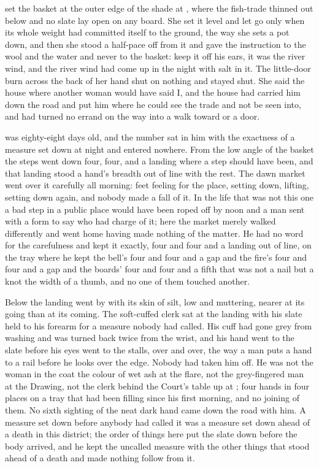 
 set the basket at the outer edge of the shade at , where the fish-trade thinned out below  and no slate lay open on any board. She set it level and let go only when its whole weight had committed itself to the ground, the way she sets a pot down, and then she stood a half-pace off from it and gave the instruction to the wool and the water and never to the basket: keep it off his ears, it was the river wind, and the river wind had come up in the night with salt in it. The little-door burn across the back of her hand shut on nothing and stayed shut. She said the house where another woman would have said I, and the house had carried him down the road and put him where he could see the trade and not be seen into, and had turned no errand on the way into a walk toward  or a door.

 was eighty-eight days old, and the number sat in him with the exactness of a measure set down at night and entered nowhere. From the low angle of the basket the steps went down four, four, and a landing where a step should have been, and that landing stood a hand's breadth out of line with the rest. The dawn market went over it carefully all morning: feet feeling for the place, setting down, lifting, setting down again, and nobody made a fall of it. In the life that was not this one a bad step in a public place would have been roped off by noon and a man sent with a form to say who had charge of it; here the market merely walked differently and went home having made nothing of the matter. He had no  word for the carefulness and kept it exactly, four and four and a landing out of line, on the tray where he kept the bell's four and four and a gap and the fire's four and four and a gap and the boards' four and four and a fifth that was not a nail but a knot the width of a thumb, and no one of them touched another.

Below the landing  went by with its skin of silt, low and muttering, nearer at its going than at its coming. The soft-cuffed clerk sat at the landing with his slate held to his forearm for a measure nobody had called. His cuff had gone grey from washing and was turned back twice from the wrist, and his hand went to the slate before his eyes went to the stalls, over and over, the way a man puts a hand to a rail before he looks over the edge. Nobody had taken him off. He was not the woman in the coat the colour of wet ash at the flare, not the grey-fingered man at the Drawing, not the clerk behind the Court's table up at ; four hands in four places on a tray that had been filling since his first morning, and no joining of them. No sixth sighting of the neat dark hand came down the road with him. A measure set down before anybody had called it was a measure set down ahead of a death in this district; the order of things here put the slate down before the body arrived, and he kept the uncalled measure with the other things that stood ahead of a death and made nothing follow from it.

